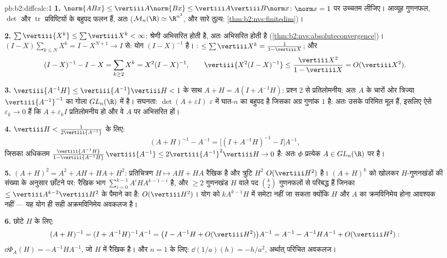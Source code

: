 \begin{solution}{pb:b2:diffcalc:1}
\textbf{1.} $\norm{ABx} \leq \vertiii A\norm{Bx} \leq
\vertiii A\vertiii B\norm x$: $\norm x = 1$ पर उच्चतम लीजिए। आव्यूह गुणनफल, $\det$ और $\operatorname{tr}$
प्रविष्टियों के बहुपद फलन हैं, अतः  ($\mathcal M_n(\R)
\simeq \R^{n^2}$, और सारे  तुल्य: \cref{thm:b2:nvs:finitedim})।

\textbf{2.} $\sum\vertiii{X^k} \leq \sum\vertiii X^k <
\infty$: श्रेणी  अभिसरित होती है, अतः अभिसरित होती
है (\cref{thm:b2:nvs:absoluteconvergence})। $(I -
X)\sum_{k\leq N}X^k = I - X^{N+1} \to I$ से: योग $(I -
X)^{-1}$ है। : $\leq \sum\vertiii X^k = \frac{1}{1 -
\vertiii X}$; और
\[
(I - X)^{-1} - I - X = \sum_{k\geq2}X^k = X^2(I - X)^{-1},
\qquad
\vertiii{X^2(I-X)^{-1}} \leq
\frac{\vertiii X^2}{1 - \vertiii X} = O(\vertiii X^2).
\]

\textbf{3.} $\vertiii{A^{-1}H}
\leq \vertiii{A^{-1}}\vertiii H < 1$ के साथ $A + H = A(I + A^{-1}H)$: प्रश्न 2 से प्रतिलोमनीय: अतः $A$ के चारों ओर
त्रिज्या $\vertiii{A^{-1}}^{-1}$ का  गोला $GL_n(\R)$ में है। सघनता: $\det(A + \varepsilon I)$ $\varepsilon$ में घात-$n$ का बहुपद
है जिसका अग्र गुणांक $1$ है: अतः उसके परिमित मूल हैं, इसलिए ऐसे $\varepsilon_k \to 0$ हैं कि
$A + \varepsilon_kI$ प्रतिलोमनीय हो और वे $A$ पर अभिसरित हों।

\textbf{4.} $\vertiii H < \frac{1}{2\vertiii{A^{-1}}}$ के लिए:
\[
(A + H)^{-1} - A^{-1}
= \bigl[(I + A^{-1}H)^{-1} - I\bigr]A^{-1},
\]
जिसका  अधिकतम $\frac{\vertiii{A^{-1}H}}{1 -
\vertiii{A^{-1}H}}\,\vertiii{A^{-1}} \leq
2\vertiii{A^{-1}}^2\vertiii H \to 0$ है: अतः $\Phi$ प्रत्येक $A \in GL_n(\R)$ पर  है।

\textbf{5.} $(A+H)^2 = A^2 + AH + HA + H^2$: प्रतिचित्रण $H
\mapsto AH + HA$ रैखिक है और त्रुटि $H^2$ $O(\vertiii H^2)$ है। $(A + H)^k$ को
खोलकर $H$-गुणनखंडों की संख्या के अनुसार छाँटने पर: रैखिक भाग $\sum_{i=0}^{k-1}A^iHA^{k-1-i}$ है, और
$\geq 2$ गुणनखंड $H$ वाले पद $\binom k2$ गुणनफलों से परिबद्ध हैं जिनका  $\leq \vertiii A^{k-2}\vertiii H^2$ के
पैमाने का है: $O(\vertiii H^2)$। योग को $kA^{k-1}H$ में समेटा नहीं जा सकता क्योंकि $H$ और
$A$ का क्रमविनिमेय होना आवश्यक नहीं --- यह योग ही सही अक्रमविनिमेय अवकलज
है।

\textbf{6.} छोटे $H$ के लिए:
\[
(A+H)^{-1} = (I + A^{-1}H)^{-1}A^{-1}
= \bigl(I - A^{-1}H + O(\vertiii H^2)\bigr)A^{-1}
= A^{-1} - A^{-1}HA^{-1} + O(\vertiii H^2) :
\]
$\dd\Phi_A(H) = -A^{-1}HA^{-1}$, जो $H$ में रैखिक है। और $n = 1$ के लिए: $\dd(1/a)(h) = -h/a^2$, अर्थात् परिचित अवकलज।


\end{solution}
